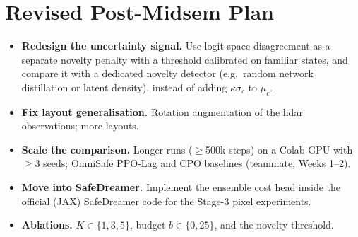 \section{Revised Post-Midsem Plan}
\begin{itemize}
  \item \textbf{Redesign the uncertainty signal.} Use logit-space disagreement as a separate novelty
        penalty with a threshold calibrated on familiar states, and compare it with a dedicated novelty
        detector (e.g.\ random network distillation or latent density), instead of adding $\kappa\sigma_c$ to $\mu_c$.
  \item \textbf{Fix layout generalisation.} Rotation augmentation of the lidar observations; more layouts.
  \item \textbf{Scale the comparison.} Longer runs ($\geq$500k steps) on a Colab GPU with $\geq$3 seeds;
        OmniSafe PPO-Lag and CPO baselines (teammate, Weeks 1--2).
  \item \textbf{Move into SafeDreamer.} Implement the ensemble cost head inside the official (JAX)
        SafeDreamer code for the Stage-3 pixel experiments.
  \item \textbf{Ablations.} $K \in \{1, 3, 5\}$, budget $b \in \{0, 25\}$, and the novelty threshold.
\end{itemize}
